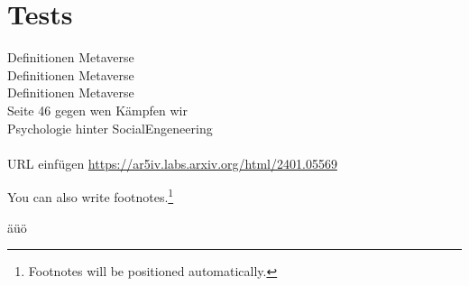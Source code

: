 

%


\section*{Tests}

Definitionen Metaverse \cite{Ball22}
\\Definitionen Metaverse \cite{Ball22a}
\\Definitionen Metaverse \cite{Drip22} \\
Seite 46 gegen wen Kämpfen wir \cite{Hypp22}\\
Psychologie hinter SocialEngeneering \cite{schu11}\\
\\

URL einfügen \url{https://ar5iv.labs.arxiv.org/html/2401.05569}


You can also write footnotes.\footnote{Footnotes will be positioned automatically.}

äüö
